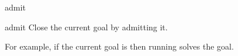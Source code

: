 \begin{tactic}{admit}
  \begin{tsyntax}[empty]{admit}
  Close the current goal by admitting it.

  For example, if the current goal is
   then
  running 
  solves the goal.
  \end{tsyntax}
\end{tactic}
